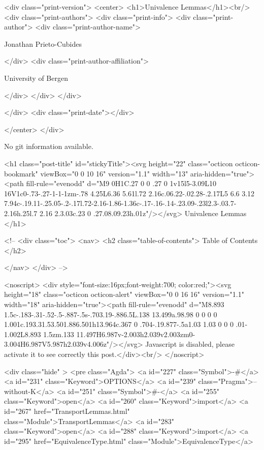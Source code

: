   <div class="print-version">
    <center>
      <h1>Univalence Lemmas</h1><br/>
        <div class="print-authors">
          <div class="print-info">
            <div class="print-author">
              <div class="print-author-name">
                
                  Jonathan Prieto-Cubides
                
              </div>
              <div class="print-author-affiliation">
                
                  University of Bergen
                
                </div>
            </div>
          </div>
          
          
        </div>
        <div class="print-date"></div>
        
        
    </center>
  </div>

  
  No git information available.
  
  <h1 class="post-title" id="stickyTitle"><svg height="22" class="octicon octicon-bookmark" viewBox="0 0 10 16" version="1.1" width="13" aria-hidden="true"><path fill-rule="evenodd" d="M9 0H1C.27 0 0 .27 0 1v15l5-3.09L10 16V1c0-.73-.27-1-1-1zm-.78 4.25L6.36 5.61l.72 2.16c.06.22-.02.28-.2.17L5 6.6 3.12 7.94c-.19.11-.25.05-.2-.17l.72-2.16-1.86-1.36c-.17-.16-.14-.23.09-.23l2.3-.03.7-2.16h.25l.7 2.16 2.3.03c.23 0 .27.08.09.23h.01z"/></svg> Univalence Lemmas
  </h1>

  <!-- 
  <div class="toc">
    <nav>
    <h2 class="table-of-contents"> Table of Contents </h2>
      

    </nav>
  </div>
   -->

  <noscript>
  <div style="font-size:16px;font-weight:700; color:red;"><svg height="18" class="octicon octicon-alert" viewBox="0 0 16 16" version="1.1" width="18" aria-hidden="true"><path fill-rule="evenodd" d="M8.893 1.5c-.183-.31-.52-.5-.887-.5s-.703.19-.886.5L.138 13.499a.98.98 0 0 0 0 1.001c.193.31.53.501.886.501h13.964c.367 0 .704-.19.877-.5a1.03 1.03 0 0 0 .01-1.002L8.893 1.5zm.133 11.497H6.987v-2.003h2.039v2.003zm0-3.004H6.987V5.987h2.039v4.006z"/></svg> Javascript is disabled, please activate it to see correctly this post.</div><br/>
  </noscript>

  <div class="hide" >
<pre class="Agda">
<a id="227" class="Symbol">{-#</a> <a id="231" class="Keyword">OPTIONS</a> <a id="239" class="Pragma">--without-K</a> <a id="251" class="Symbol">#-}</a>
<a id="255" class="Keyword">open</a> <a id="260" class="Keyword">import</a> <a id="267" href="TransportLemmas.html" class="Module">TransportLemmas</a>
<a id="283" class="Keyword">open</a> <a id="288" class="Keyword">import</a> <a id="295" href="EquivalenceType.html" class="Module">EquivalenceType</a>

